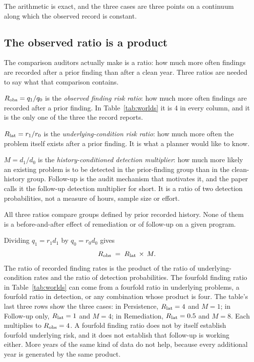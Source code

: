 The arithmetic is exact, and the three cases are three points on a continuum
along which the observed record is constant.

\subsection{The observed ratio is a product}

The comparison auditors actually make is a ratio: how much more often findings
are recorded after a prior finding than after a clean year. Three ratios are
needed to say what that comparison contains.

$R_{\mathrm{obs}} = q_1/q_0$ is the \emph{observed finding risk ratio}: how much more
often findings are recorded after a prior finding. In Table~\ref{tab:worlds}
it is 4 in every column, and it is the only one of the three the record
reports.

$R_{\mathrm{lat}} = r_1/r_0$ is the \emph{underlying-condition risk ratio}: how much
more often the problem itself exists after a prior finding. It is what a
planner would like to know.

$M = d_1/d_0$ is the \emph{history-conditioned detection multiplier}: how
much more likely an existing problem is to be detected in the prior-finding
group than in the clean-history group. Follow-up is the audit mechanism that
motivates it, and the paper calls it the follow-up detection multiplier for
short. It is a ratio of two detection probabilities, not a measure of hours,
sample size or effort.

All three ratios compare groups defined by prior recorded history. None of
them is a before-and-after effect of remediation or of follow-up on a given
program.

Dividing $q_1 = r_1 d_1$ by $q_0 = r_0 d_0$ gives
%
\begin{equation}\label{eq:product}
  R_{\mathrm{obs}} \;=\; R_{\mathrm{lat}} \,\times\, M .
\end{equation}
%
The ratio of recorded finding rates is the product of the ratio of
underlying-condition rates and the ratio of detection probabilities. The
fourfold finding ratio in Table~\ref{tab:worlds} can come from a fourfold
ratio in underlying problems, a fourfold ratio in detection, or any
combination whose product is four. The table's last three
rows show the three cases: in Persistence, $R_{\mathrm{lat}} = 4$ and $M = 1$; in
Follow-up only, $R_{\mathrm{lat}} = 1$ and $M = 4$; in Remediation, $R_{\mathrm{lat}} = 0.5$ and
$M = 8$. Each multiplies to $R_{\mathrm{obs}} = 4$. A fourfold finding ratio does not by
itself establish fourfold underlying risk, and it does not establish that
follow-up is working either. More years of the same kind of data do not help,
because every additional year is generated by the same product.

